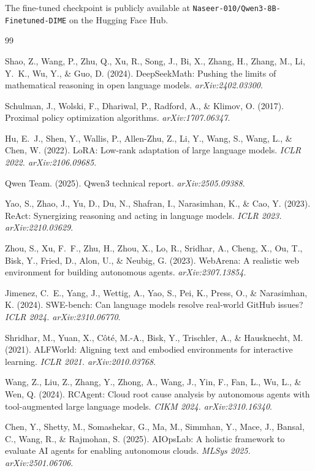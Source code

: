 \documentclass{article}
\begin{document}
The fine-tuned checkpoint is publicly available at
\texttt{Naseer-010/Qwen3-8B-Finetuned-DIME} on the Hugging Face Hub.

\begin{thebibliography}{99}

Shao, Z., Wang, P., Zhu, Q., Xu, R., Song, J., Bi, X., Zhang, H., Zhang, M., Li,
Y.~K., Wu, Y., \& Guo, D. (2024). DeepSeekMath: Pushing the limits of mathematical
reasoning in open language models. \textit{arXiv:2402.03300}.

Schulman, J., Wolski, F., Dhariwal, P., Radford, A., \& Klimov, O. (2017). Proximal
policy optimization algorithms. \textit{arXiv:1707.06347}.

Hu, E.~J., Shen, Y., Wallis, P., Allen-Zhu, Z., Li, Y., Wang, S., Wang, L., \& Chen,
W. (2022). LoRA: Low-rank adaptation of large language models.
\textit{ICLR 2022. arXiv:2106.09685}.

Qwen Team. (2025). Qwen3 technical report. \textit{arXiv:2505.09388}.

Yao, S., Zhao, J., Yu, D., Du, N., Shafran, I., Narasimhan, K., \& Cao, Y. (2023).
ReAct: Synergizing reasoning and acting in language models.
\textit{ICLR 2023. arXiv:2210.03629}.

Zhou, S., Xu, F.~F., Zhu, H., Zhou, X., Lo, R., Sridhar, A., Cheng, X., Ou, T.,
Bisk, Y., Fried, D., Alon, U., \& Neubig, G. (2023). WebArena: A realistic web
environment for building autonomous agents. \textit{arXiv:2307.13854}.

Jimenez, C.~E., Yang, J., Wettig, A., Yao, S., Pei, K., Press, O., \& Narasimhan, K.
(2024). SWE-bench: Can language models resolve real-world GitHub issues?
\textit{ICLR 2024. arXiv:2310.06770}.

Shridhar, M., Yuan, X., C\^{o}t\'{e}, M.-A., Bisk, Y., Trischler, A., \& Hausknecht,
M. (2021). ALFWorld: Aligning text and embodied environments for interactive learning.
\textit{ICLR 2021. arXiv:2010.03768}.

Wang, Z., Liu, Z., Zhang, Y., Zhong, A., Wang, J., Yin, F., Fan, L., Wu, L., \& Wen,
Q. (2024). RCAgent: Cloud root cause analysis by autonomous agents with tool-augmented
large language models. \textit{CIKM 2024. arXiv:2310.16340}.

Chen, Y., Shetty, M., Somashekar, G., Ma, M., Simmhan, Y., Mace, J., Bansal, C.,
Wang, R., \& Rajmohan, S. (2025). AIOpsLab: A holistic framework to evaluate AI agents
for enabling autonomous clouds. \textit{MLSys 2025. arXiv:2501.06706}.


\end{thebibliography}
\end{document}
